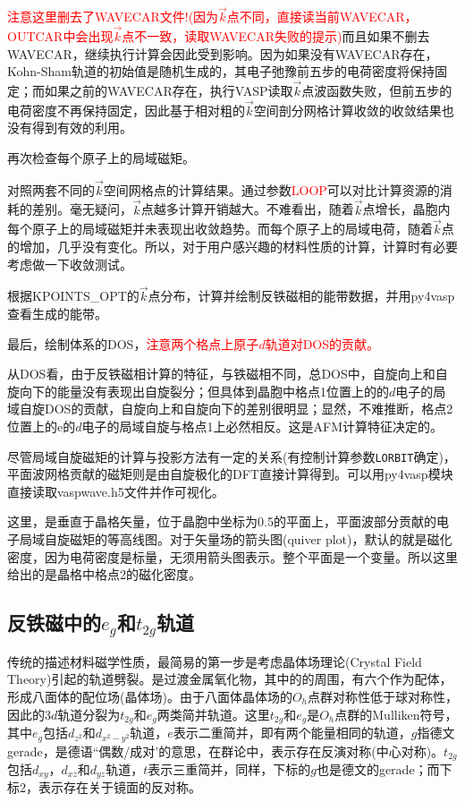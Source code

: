 \textcolor{red}{注意这里删去了\textrm{WAVECAR}文件!(因为$\vec k$点不同，直接读当前\textrm{WAVECAR}，\textrm{OUTCAR}中会出现$\vec k$点不一致，读取\textrm{WAVECAR}失败的提示)}而且如果不删去\textrm{WAVECAR}，继续执行计算会因此受到影响。因为如果没有\textrm{WAVECAR}存在，\textrm{Kohn-Sham}轨道的初始值是随机生成的，其电子弛豫前五步的电荷密度将保持固定；而如果之前的\textrm{WAVECAR}存在，执行\textrm{VASP}读取$\vec k$点波函数失败，但前五步的电荷密度不再保持固定，因此基于相对粗的$\vec k$空间剖分网格计算收敛的收敛结果也没有得到有效的利用。

再次检查每个原子上的局域磁矩。

对照两套不同的$\vec k$空间网格点的计算结果。通过参数\textcolor{red}{\textrm{LOOP}}可以对比计算资源的消耗的差别。毫无疑问，$\vec k$点越多计算开销越大。不难看出，随着$\vec k$点增长，晶胞内每个原子上的局域磁矩并未表现出收敛趋势。而每个原子上的局域电荷，随着$\vec k$点的增加，几乎没有变化。所以，对于用户感兴趣的材料性质的计算，计算时有必要考虑做一下收敛测试。

根据\textrm{KPOINTS\_OPT}的$\vec k$点分布，计算并绘制反铁磁相的能带数据，并用\textrm{py4vasp}查看生成的能带。

最后，绘制体系的\textrm{DOS}，\textcolor{red}{注意两个格点上原子$d$轨道对\textrm{DOS}的贡献。}

从\textrm{DOS}看，由于反铁磁相计算的特征，与铁磁相不同，总\textrm{DOS}中，自旋向上和自旋向下的能量没有表现出自旋裂分；但具体到晶胞中格点1位置上的的$d$电子的局域自旋\textrm{DOS}的贡献，自旋向上和自旋向下的差别很明显；显然，不难推断，格点2位置上的e的$d$电子的局域自旋与格点1上必然相反。这是\textrm{AFM}计算特征决定的。

尽管局域自旋磁矩的计算与投影方法有一定的关系(有控制计算参数\texttt{LORBIT}确定)，平面波网格贡献的磁矩则是由自旋极化的\textrm{DFT}直接计算得到。可以用\textrm{py4vasp}模块直接读取\textrm{vaspwave.h5}文件并作可视化。

这里，是垂直于晶格矢量，位于晶胞中坐标为0.5的平面上，平面波部分贡献的电子局域自旋磁矩的等高线图。对于矢量场的箭头图\textrm{(quiver plot)}，默认的就是磁化密度，因为电荷密度是标量，无须用箭头图表示。整个平面是一个变量。所以这里给出的是晶格中格点2的磁化密度。

\subsection{反铁磁中的$e_g$和$t_{2g}$轨道}
传统的描述材料磁学性质，最简易的第一步是考虑晶体场理论\textrm{(Crystal Field Theory)}引起的轨道劈裂。是过渡金属氧化物，其中的的周围，有六个作为配体，形成八面体的配位场(晶体场)。由于八面体晶体场的$O_h$点群对称性低于球对称性，因此的$3d$轨道分裂为$t_{2g}$和$e_g$两类简并轨道。这里$t_{2g}$和$e_g$是$O_h$点群的\textrm{Mulliken}符号，其中$e_g$包括$d_{z^2}$和$d_{x^2-y^2}$轨道，$e$表示二重简并，即有两个能量相同的轨道，$g$指德文\textrm{gerade}，是德语``偶数/成对'的意思，在群论中，表示存在反演对称(中心对称)。$t_{2g}$包括$d_{xy}$，$d_{xz}$和$d_{yz}$轨道，$t$表示三重简并，同样，下标的$g$也是德文的\textrm{gerade}；而下标2，表示存在关于镜面的反对称。

